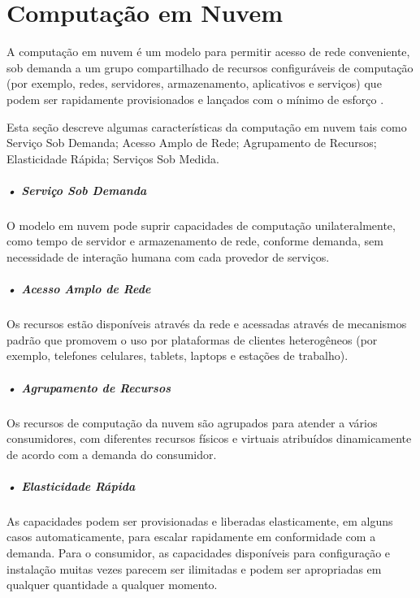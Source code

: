\documentclass[portuguese,oneside]{tcc}
\begin{document}


\section{Computação em Nuvem}
A computação em nuvem é um modelo para permitir acesso de rede conveniente, sob demanda a um grupo compartilhado de recursos configuráveis de computação (por exemplo, redes, servidores, armazenamento, aplicativos e serviços) que podem ser rapidamente provisionados e lançados com o mínimo de esforço \cite{NIST}.

Esta seção descreve algumas características da computação em nuvem tais como Serviço Sob Demanda; Acesso Amplo de Rede; Agrupamento de Recursos; Elasticidade Rápida; Serviços Sob Medida.

\subparagraph{• Serviço Sob Demanda}
O modelo em nuvem pode suprir capacidades de computação unilateralmente, como tempo de servidor e armazenamento de rede, conforme demanda, sem necessidade de interação humana com cada provedor de serviços.

\subparagraph{• Acesso Amplo de Rede}
Os recursos estão disponíveis através da rede e acessadas através de mecanismos padrão que promovem o uso por plataformas de clientes heterogêneos (por exemplo, telefones celulares, tablets, laptops e estações de trabalho).

\subparagraph{• Agrupamento de Recursos}
Os recursos de computação da nuvem são agrupados para atender a vários consumidores, com diferentes recursos físicos e virtuais atribuídos dinamicamente de acordo com a demanda do consumidor.

\subparagraph{• Elasticidade Rápida}
As capacidades podem ser provisionadas e liberadas elasticamente, em alguns casos automaticamente, para escalar rapidamente em conformidade com a demanda.
Para o consumidor, as capacidades disponíveis para configuração e instalação muitas vezes parecem ser ilimitadas e podem ser apropriadas em qualquer quantidade a qualquer momento.
\end{document}
